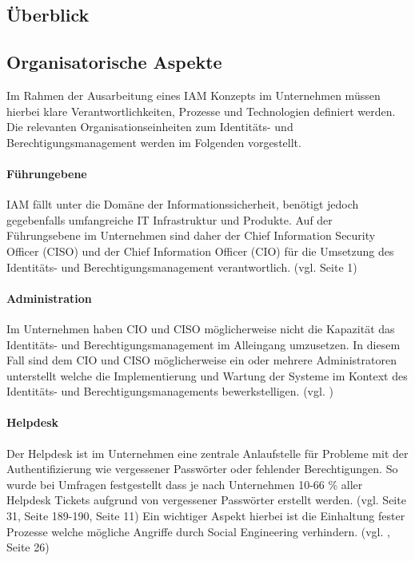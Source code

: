 \documentclass[11pt]{article}
\begin{document}
\subsection{Überblick}
\subsection{Organisatorische Aspekte}
Im Rahmen der Ausarbeitung eines IAM Konzepts im Unternehmen müssen hierbei klare Verantwortlichkeiten, Prozesse und Technologien definiert werden. Die relevanten Organisationseinheiten zum Identitäts- und Berechtigungsmanagement werden im Folgenden vorgestellt.
\paragraph{Führungebene}
IAM fällt unter die Domäne der Informationssicherheit, benötigt jedoch gegebenfalls umfangreiche IT Infrastruktur und Produkte. Auf der Führungsebene im Unternehmen sind daher der Chief Information Security Officer (CISO) und der Chief Information Officer (CIO) für die Umsetzung des Identitäts- und Berechtigungsmanagement verantwortlich. (vgl. \cite{mont2010economics} Seite 1)
\paragraph{Administration}
Im Unternehmen haben CIO und CISO möglicherweise nicht die Kapazität das Identitäts- und Berechtigungsmanagement im Alleingang umzusetzen. In diesem Fall sind dem CIO und CISO möglicherweise ein oder mehrere Administratoren unterstellt welche die Implementierung und Wartung der Systeme im Kontext des Identitäts- und Berechtigungsmanagements bewerkstelligen. (vgl. \cite{microsoft2024iamadmin})
\paragraph{Helpdesk}
Der Helpdesk ist im Unternehmen eine zentrale Anlaufstelle für Probleme mit der Authentifizierung wie vergessener Passwörter oder fehlender Berechtigungen. So wurde bei Umfragen festgestellt dass je nach Unternehmen 10-66 \% aller Helpdesk Tickets aufgrund von vergessener Passwörter erstellt werden. (vgl. \cite{ylen2004centralized} Seite 31, \cite{tsolkas2017} Seite 189-190, \cite{hummer2016adaptive} Seite 11) Ein wichtiger Aspekt hierbei ist die Einhaltung fester Prozesse welche mögliche Angriffe durch Social Engineering verhindern. (vgl. \cite{wood2005implementing}, \cite{ylen2004centralized} Seite 26)
\end{document}
